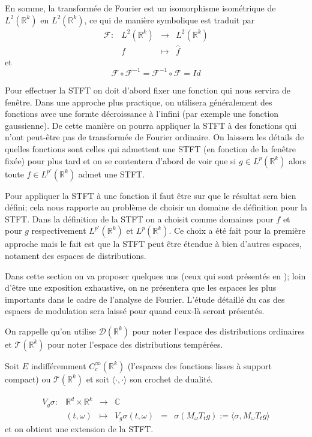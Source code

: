 	En somme, la transformée de Fourier est un isomorphisme isométrique de $L^2(\mathbb{R}^k)$ en $L^2(\mathbb{R}^k)$, ce qui de manière symbolique est traduit par
	$$
	\begin{matrix}
	\mathcal{F} : & L^2(\mathbb{R}^k) & \rightarrow & L^2(\mathbb{R}^k) \\
	& f & \mapsto & \hat{f}
	\end{matrix}
	$$
	et
	$$ \mathcal{F} \circ \mathcal{F}^{-1} = \mathcal{F}^{-1} \circ \mathcal{F} = Id $$

	Pour effectuer la STFT on doit d'abord fixer une fonction qui nous servira de fenêtre. Dans une approche plus practique, on utilisera généralement des fonctions avec une formte décroissance à l'infini (par exemple une fonction gaussienne). De cette manière on pourra appliquer la STFT à des fonctions qui n'ont peut-être pas de transformée de Fourier ordinaire. On laissera les détails de quelles fonctions sont celles qui admettent une STFT (en fonction de la fenêtre fixée) pour plus tard et on se contentera d'abord de voir que si $g\in L^{p}(\mathbb{R}^{k})$ alors toute $f\in L^{p'} (\mathbb{R}^k)$ admet une STFT.

	Pour appliquer la STFT à une fonction il faut être sur que le résultat sera bien défini; cela nous rapporte au problème de choisir un domaine de définition pour la STFT.
	Dans la définition de la STFT on a choisit comme domaines pour $f$ et pour $g$ respectivement $L^{p'} (\mathbb{R}^k) $ et $L^p (\mathbb{R}^k)$. Ce choix a été fait pour la première approche mais le fait est que la STFT peut être étendue à bien d'autres espaces, notament des espaces de distributions.

	Dans cette section on va proposer quelques uns (ceux qui sont présentés en \cite{Grochenig}); loin d'être une exposition exhaustive, on ne présentera que les espaces les plus importants dans le cadre de l'analyse de Fourier. L'étude détaillé du cas des espaces de modulation sera laissé pour quand ceux-là seront présentés.

	On rappelle qu'on utilise $\mathscr{D} (\mathbb{R}^k)$ pour noter l'espace des distributions ordinaires et $\mathscr{T} (\mathbb{R}^k)$ pour noter l'espace des distributions tempérées.

	Soit $E$ indifféremment $C^{\infty}_{c} (\mathbb{R}^{k})$ (l'espaces des fonctions lisses à support compact) ou $\mathscr{T} (\mathbb{R}^k)$ et soit $\langle \cdot , \cdot \rangle$ son crochet de dualité.

	$$
	\begin{matrix}
	V_{g}\sigma : & \mathbb{R}^d \times \mathbb{R}^k & \rightarrow & \mathbb{C} \\
	& (t,\omega) & \mapsto & V_{g}\sigma (t, \omega) &=& \sigma(M_{\omega}T_{t}g) := \langle \sigma, M_{\omega}T_{t}g \rangle 
	\end{matrix}
	$$
	et on obtient une extension de la STFT.

